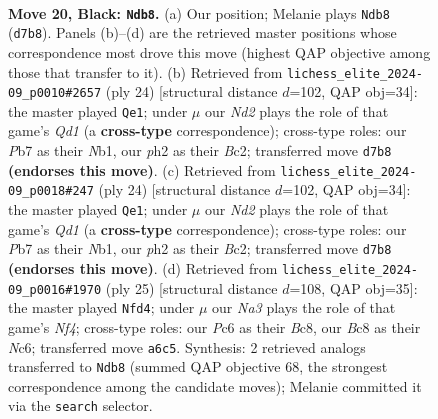 \documentclass[11pt]{article}
\begin{document}
\clearpage

\begin{figure}[p]\centering
\begin{subfigure}{0.46\textwidth}\centering
\resizebox{\linewidth}{!}{%
\newchessgame
\chessboard[
  setfen={r1b1qrk1/1p1n3p/n1p1p3/p2p1p2/3P1P2/2NQ1N2/PPP2KPP/3R1B1R b - - 3 20},
  showmover=false,
  pgfstyle=straightmove, color=movearrow, markmove={d7-b8}
]}
\caption{}
\end{subfigure}\hfill
\begin{subfigure}{0.46\textwidth}\centering
\resizebox{\linewidth}{!}{%
\newchessgame
\chessboard[
  setfen={r2q1rk1/1pp2pp1/2n1b2p/p2np3/8/2PPPN1P/PPB3P1/RN1Q1RK1 w - - 0 13},
  showmover=false,
  pgfstyle=straightmove, color=movearrow, markmove={d1-e1}
]}
\caption{}
\end{subfigure}
\\[4pt]
\begin{subfigure}{0.46\textwidth}\centering
\resizebox{\linewidth}{!}{%
\newchessgame
\chessboard[
  setfen={r2q1rk1/1pp2pp1/2n1b2p/p2np3/8/2PPPN1P/PPB3P1/RN1Q1RK1 w - - 0 13},
  showmover=false,
  pgfstyle=straightmove, color=movearrow, markmove={d1-e1}
]}
\caption{}
\end{subfigure}\hfill
\begin{subfigure}{0.46\textwidth}\centering
\resizebox{\linewidth}{!}{%
\newchessgame
\chessboard[
  setfen={r1bq1rk1/pp5p/2n1p1p1/2ppPn2/8/2NB1N1Q/PPP2PPP/2KR3R b - - 3 13},
  showmover=false,
  pgfstyle=straightmove, color=movearrow, markmove={f5-d4}
]}
\caption{}
\end{subfigure}
\caption{\textbf{Move 20, Black: \texttt{Ndb8}.} (a) Our position; Melanie plays \texttt{Ndb8} (\texttt{d7b8}). Panels (b)--(d) are the retrieved master positions whose correspondence most drove this move (highest QAP objective among those that transfer to it). (b) Retrieved from \texttt{lichess\_elite\_2024-09\_p0010\#2657} (ply 24) [structural distance $d$=102, QAP obj=34]: the master played \texttt{Qe1}; under $\mu$ our \emph{Nd2} plays the role of that game's \emph{Qd1} (a \textbf{cross-type} correspondence); cross-type roles: our \emph{P}b7 as their \emph{N}b1, our \emph{p}h2 as their \emph{B}c2; transferred move \texttt{d7b8} \textbf{(endorses this move)}. (c) Retrieved from \texttt{lichess\_elite\_2024-09\_p0018\#247} (ply 24) [structural distance $d$=102, QAP obj=34]: the master played \texttt{Qe1}; under $\mu$ our \emph{Nd2} plays the role of that game's \emph{Qd1} (a \textbf{cross-type} correspondence); cross-type roles: our \emph{P}b7 as their \emph{N}b1, our \emph{p}h2 as their \emph{B}c2; transferred move \texttt{d7b8} \textbf{(endorses this move)}. (d) Retrieved from \texttt{lichess\_elite\_2024-09\_p0016\#1970} (ply 25) [structural distance $d$=108, QAP obj=35]: the master played \texttt{Nfd4}; under $\mu$ our \emph{Na3} plays the role of that game's \emph{Nf4}; cross-type roles: our \emph{P}c6 as their \emph{B}c8, our \emph{B}c8 as their \emph{N}c6; transferred move \texttt{a6c5}. Synthesis: 2 retrieved analogs transferred to \texttt{Ndb8} (summed QAP objective 68, the strongest correspondence among the candidate moves); Melanie committed it via the \texttt{search} selector.}
\label{fig:thought-m39}
\end{figure}
\end{document}
